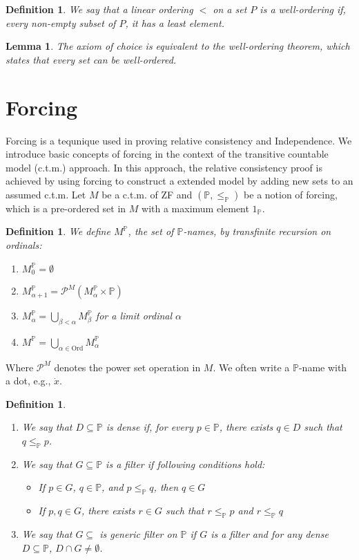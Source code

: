 \documentclass{report}
\newtheorem{lem}[thm]{Lemma}
\newtheorem{dfn}[thm]{Definition}
\newcommand{\Pbb}{\mathbb{P}}
\begin{document}
\begin{dfn}
  We say that a linear ordering $<$ on a set $P$ is a \emph{well-ordering} if, every non-empty subset of $P$, it has a least element.
\end{dfn}

\begin{lem}
  The axiom of choice is equivalent to the well-ordering theorem, which states that every set can be well-ordered.
\end{lem}

\section{Forcing}
Forcing is a tequnique used in proving relative consistency and Independence.
We introduce basic concepts of forcing in the context of the transitive countable model (c.t.m.) approach.
In this approach, the relative consistency proof is achieved by using forcing to construct a extended model by adding new sets to an assumed c.t.m.
Let $M$ be a c.t.m. of ZF and $(\Pbb, \leq_{\Pbb})$ be a notion of forcing, which is a pre-ordered set in $M$ with a maximum element $1_{\Pbb}$.

\begin{dfn}
  We define $M^{\Pbb}$, the set of \emph{$\Pbb$-names}, by transfinite recursion on ordinals:
  \begin{enumerate}
    \item $M^{\Pbb}_0 = \emptyset$
    \item $M^{\Pbb}_{\alpha + 1} = \mathcal{P}^M(M^{\Pbb}_{\alpha} \times \Pbb)$
    \item $M^{\Pbb}_{\alpha} = \bigcup_{\beta < \alpha} M^{\Pbb}_{\beta}$ for a limit ordinal $\alpha$
    \item $M^{\Pbb} = \bigcup_{\alpha \in \text{Ord}} M^{\Pbb}_{\alpha}$
  \end{enumerate}
\end{dfn}
Where $\mathcal{P}^M$ denotes the power set operation in $M$. 
We often write a $\Pbb$-name with a dot, e.g., $\dot{x}$.

\begin{dfn} %
  \,
  \begin{enumerate}
    \item We say that $D \subseteq \Pbb$ is \emph{dense} if, for every $p \in \Pbb$, there exists $q \in D$ such that $q \leq_{\Pbb} p$.
    \item We say that $G \subseteq \Pbb$ is a \emph{filter} if following conditions hold:
      \begin{itemize}
        \item If $p \in G$, $q \in \Pbb$, and $p \leq_{\Pbb} q$, then $q \in G$
        \item If $p, q \in G$, there exists $r \in G$ such that $r \leq_{\Pbb} p$ and $r \leq_{\Pbb} q$
      \end{itemize}
    \item We say that $G \subseteq$ is \emph{generic filter} on $\Pbb$ if $G$ is a filter and for any dense $D \subseteq \Pbb$, $D \cap G \neq \emptyset$.
  \end{enumerate}
\end{dfn}
\end{document}
